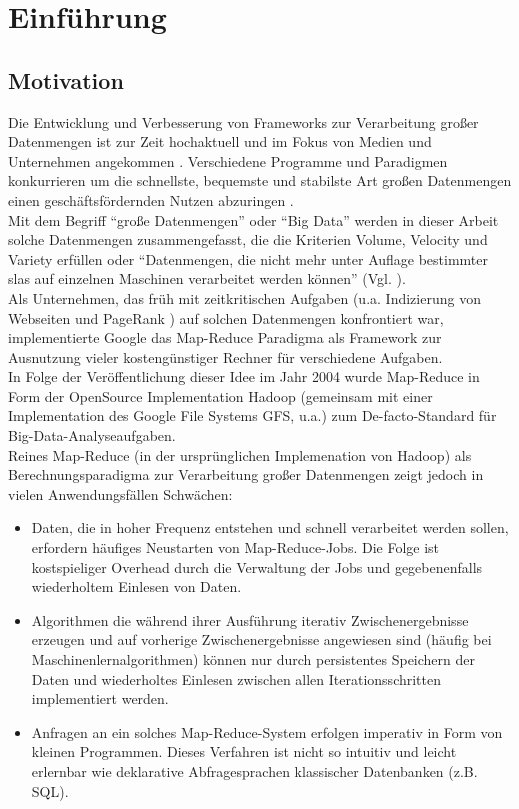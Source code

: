 \chapter{Einführung}

\section{Motivation}

Die Entwicklung und Verbesserung von Frameworks zur Verarbeitung großer Datenmengen ist zur Zeit hochaktuell und im Fokus von Medien und Unternehmen angekommen \cite{Bit14}. Verschiedene Programme und Paradigmen konkurrieren um die schnellste, bequemste und stabilste Art großen Datenmengen einen geschäftsfördernden Nutzen abzuringen \cite{Sin14}.\\

Mit dem Begriff "`große Datenmengen"' oder "`Big Data"' werden in dieser Arbeit solche Datenmengen zusammengefasst, die die Kriterien Volume, Velocity und Variety \cite{Lan01} erfüllen oder "`Datenmengen, die nicht mehr unter Auflage bestimmter \gls{sla}s auf einzelnen Maschinen verarbeitet werden können"' (Vgl. \cite{Sam14}).\\

Als Unternehmen, das früh mit zeitkritischen Aufgaben (u.a.  Indizierung von Webseiten und PageRank \cite{page2001method}) auf solchen Datenmengen konfrontiert war, implementierte Google das Map-Reduce Paradigma \cite{Dean04} als Framework zur Ausnutzung vieler kostengünstiger Rechner für verschiedene Aufgaben. \\

In Folge der Veröffentlichung dieser Idee im Jahr 2004 wurde Map-Reduce in Form der OpenSource Implementation Hadoop (gemeinsam mit einer Implementation des Google File Systems GFS, u.a.) \cite{Ghema03} zum De-facto-Standard für Big-Data-Analyseaufgaben.\\

Reines Map-Reduce (in der ursprünglichen Implemenation von Hadoop) als Berechnungsparadigma zur Verarbeitung großer Datenmengen zeigt jedoch in vielen Anwendungsfällen Schwächen:
\begin{itemize}
	\item Daten, die in hoher Frequenz entstehen und schnell verarbeitet werden sollen, erfordern häufiges Neustarten von Map-Reduce-Jobs. Die Folge ist kostspieliger Overhead durch die Verwaltung der Jobs und gegebenenfalls wiederholtem Einlesen von Daten.
	\item Algorithmen die während ihrer Ausführung iterativ Zwischenergebnisse erzeugen und auf vorherige Zwischenergebnisse angewiesen sind (häufig bei Maschinenlernalgorithmen) können nur durch persistentes Speichern der Daten und wiederholtes Einlesen zwischen allen Iterationsschritten implementiert werden.
	\item Anfragen an ein solches Map-Reduce-System erfolgen imperativ in Form von kleinen Programmen. Dieses Verfahren ist nicht so intuitiv und leicht erlernbar wie deklarative Abfragesprachen klassischer Datenbanken (z.B. SQL).
\end{itemize}

